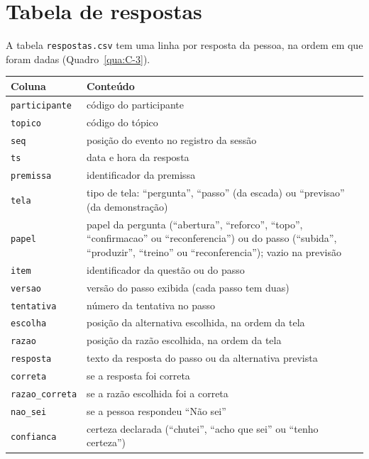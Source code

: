 \section{Tabela de respostas}

A tabela \texttt{respostas.csv} tem uma linha por resposta da pessoa, na ordem em que foram dadas (Quadro~\ref{qua:C-3}).

\begin{quadro}[htbp]
\caption{Colunas de \texttt{respostas.csv}}\label{qua:C-3}
\footnotesize
\begin{tabularx}{\textwidth}{|X|X|}
\hline
\textbf{Coluna} & \textbf{Conteúdo} \\ \hline
\texttt{participante} & código do participante \\ \hline
\texttt{topico} & código do tópico \\ \hline
\texttt{seq} & posição do evento no registro da sessão \\ \hline
\texttt{ts} & data e hora da resposta \\ \hline
\texttt{premissa} & identificador da premissa \\ \hline
\texttt{tela} & tipo de tela: ``pergunta'', ``passo'' (da escada) ou ``previsao'' (da demonstração) \\ \hline
\texttt{papel} & papel da pergunta (``abertura'', ``reforco'', ``topo'', ``confirmacao'' ou ``reconferencia'') ou do passo (``subida'', ``produzir'', ``treino'' ou ``reconferencia''); vazio na previsão \\ \hline
\texttt{item} & identificador da questão ou do passo \\ \hline
\texttt{versao} & versão do passo exibida (cada passo tem duas) \\ \hline
\texttt{tentativa} & número da tentativa no passo \\ \hline
\texttt{escolha} & posição da alternativa escolhida, na ordem da tela \\ \hline
\texttt{razao} & posição da razão escolhida, na ordem da tela \\ \hline
\texttt{resposta} & texto da resposta do passo ou da alternativa prevista \\ \hline
\texttt{correta} & se a resposta foi correta \\ \hline
\texttt{razao\_correta} & se a razão escolhida foi a correta \\ \hline
\texttt{nao\_sei} & se a pessoa respondeu ``Não sei'' \\ \hline
\texttt{confianca} & certeza declarada (``chutei'', ``acho que sei'' ou ``tenho certeza'') \\ \hline

\end{tabularx}
\end{quadro}

